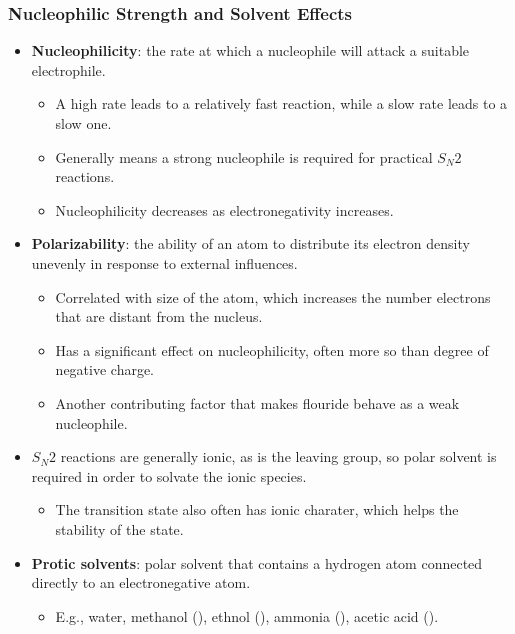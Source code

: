 \documentclass[12pt,a4paper]{article}
\begin{document}
\begin{itemize}
    \subsubsection{Nucleophilic Strength and Solvent Effects}
    \begin{itemize}
        \item \textbf{Nucleophilicity}: the rate at which a nucleophile will attack a suitable electrophile.
            \begin{itemize}
                \item A high rate leads to a relatively fast reaction, while a slow rate leads to a slow one.
                \item Generally means a strong nucleophile is required for practical \(S_N2\) reactions.
                \item Nucleophilicity decreases as electronegativity increases.
            \end{itemize}
        \item \textbf{Polarizability}: the ability of an atom to distribute its electron density unevenly in response to external influences.
            \begin{itemize}
                \item Correlated with size of the atom, which increases the number electrons that are distant from the nucleus.
                \item Has a significant effect on nucleophilicity, often more so than degree of negative charge.
                \item Another contributing factor that makes flouride behave as a weak nucleophile.
            \end{itemize}
        \item \(S_N2\) reactions are generally ionic, as is the leaving group, so polar solvent is required in order to solvate the ionic species.
            \begin{itemize}
                \item The transition state also often has ionic charater, which helps the stability of the state.
            \end{itemize}
        \item \textbf{Protic solvents}: polar solvent that contains a hydrogen atom connected directly to an electronegative atom. 
            \begin{itemize}
                \item E.g., water, methanol (), ethnol (), ammonia (), acetic acid ().

\end{itemize}
\end{itemize}
\end{itemize}
\end{document}
